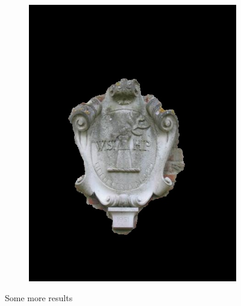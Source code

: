 \documentclass[a4paper,11]{article}
\begin{document}
\begin{center}
\begin{figure}[H]
\begin{subfigure}{.33\textwidth}
    \end{subfigure}
    \begin{subfigure}{0.33\textwidth}
      \centering
      \includegraphics[width=0.9\linewidth]{results/memorial}
   \end{subfigure}
    \caption{Some more results}
  \end{figure}
  \end{center}
  
\end{document}

